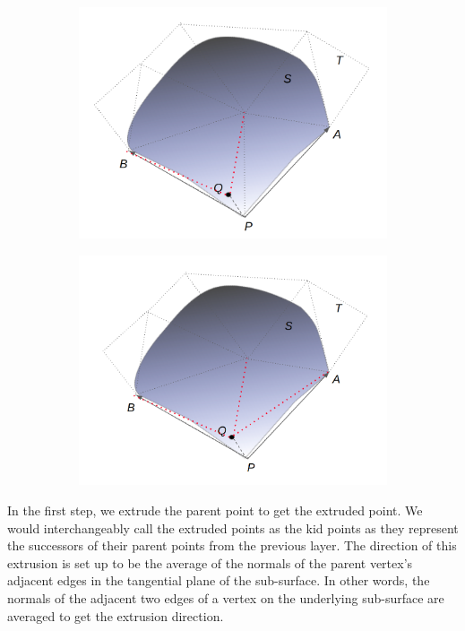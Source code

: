 \begin{figure}
\begin{subfigure}{0.5\textwidth}
	\includegraphics[width=\linewidth]{img/m1/pointInsertion.png}
	\caption{}
	\label{fig-pointPlacement3}
\end{subfigure}%
\begin{subfigure}{0.5\textwidth}
	\centering
	\includegraphics[width=\linewidth]{img/m1/localReconnection.png}
	\caption{}
	\label{fig-pointPlacement4}
\end{subfigure}
\caption{}
\label{fig-point}
\end{figure}

In the first step, we extrude the parent point to get the extruded point. We would interchangeably call the extruded points as the kid points as they represent the successors of their parent points from the previous layer. The direction of this extrusion is set up to be the average of the normals of the parent vertex's adjacent edges in the tangential plane of the sub-surface. In other words, the normals of the adjacent two edges of a vertex on the underlying sub-surface are averaged to get the extrusion direction.


